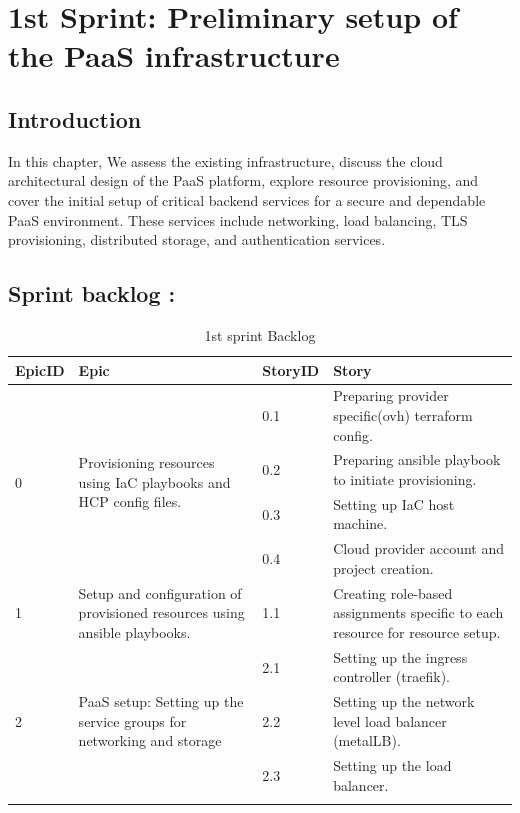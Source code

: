 \graphicspath{{./assets/}}
\setcounter{mtc}{2}
\chapter{1st Sprint: Preliminary setup of the PaaS infrastructure  }

\section*{Introduction}

\hspace{7mm}In this chapter, We assess the existing infrastructure, discuss the cloud architectural design of the PaaS platform, explore resource provisioning, and cover the initial setup of critical backend services for a secure and dependable PaaS environment. These services include networking, load balancing, TLS provisioning, distributed storage, and authentication services.

\section{Sprint backlog :}

\begin{longtable}[ht]{|m{1.5cm}|m{4cm}|m{1.5cm}|m{7cm}|}
\hline
{\textbf{EpicID}} & {\textbf{Epic}} & {\textbf{StoryID}} & {\textbf{Story}} \\
\endhead
\hline
\multirow{4}{1.5cm}{0} & \multirow{4}{4cm}{\raggedright Provisioning resources using IaC playbooks and HCP config files.}  &  0.1	 & Preparing provider specific(ovh) terraform config. \\
\cline{3-4}
& & 0.2 & Preparing ansible playbook to initiate provisioning. \\
\cline{3-4}
& & 0.3	& Setting up IaC host machine.  \\
\cline{3-4}
& & 0.4	& Cloud provider account and project creation.  \\
\hline
1  & Setup and configuration of provisioned resources using ansible playbooks.	 &  1.1	 &  Creating role-based assignments specific to each resource for resource setup. \\
\hline
\multirow{3}{1.5cm}{2} & \multirow{3}{4cm}{\raggedright PaaS setup: Setting up the service groups for networking and storage}	 &  2.1	 &  Setting up the ingress controller (traefik).\\
\cline{3-4}
& & 2.2 & Setting up the network level load balancer (metalLB). \\
\cline{3-4}
& & 2.3	& Setting up the load balancer. \\
\cline{3-4}
\hline
\caption{1st sprint Backlog}
\end{longtable}
